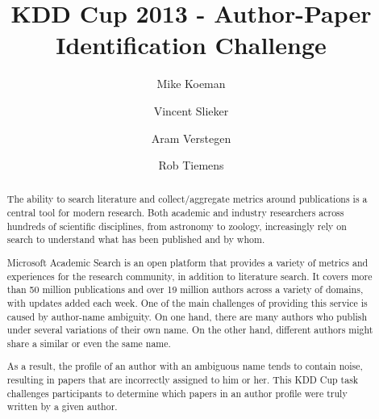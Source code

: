 \documentclass[10pt,a4paper]{article}
\title{KDD Cup 2013 - Author-Paper Identification Challenge}
\author{ Mike Koeman \and Vincent Slieker   \and Aram Verstegen \and Rob Tiemens}
\begin{document}
\maketitle

\begin{abstract}
The ability to search literature and collect/aggregate metrics around publications is a central tool for modern research. Both academic and industry researchers across hundreds of scientific disciplines, from astronomy to zoology, increasingly rely on search to understand what has been published and by whom.

Microsoft Academic Search is an open platform that provides a variety of metrics and experiences for the research community, in addition to literature search. It covers more than 50 million publications and over 19 million authors across a variety of domains, with updates added each week. One of the main challenges of providing this service is caused by author-name ambiguity. On one hand, there are many authors who publish under several variations of their own name.  On the other hand, different authors might share a similar or even the same name.

As a result, the profile of an author with an ambiguous name tends to contain noise, resulting in papers that are incorrectly assigned to him or her. This KDD Cup task challenges participants to determine which papers in an author profile were truly written by a given author.
\end{abstract}

\nocite{chowdhury2010introduction}
\nocite{liu2005co}
\nocite{glanzel2005analysing}
\nocite{morel2009co}
\nocite{niels2008writer}
\nocite{steyvers2004probabilistic}
\nocite{newman2004coauthorship}
\nocite{Liu:2006:WDM:1215470}
\nocite{Witten:2005:DMP:1205860}















\end{document}
